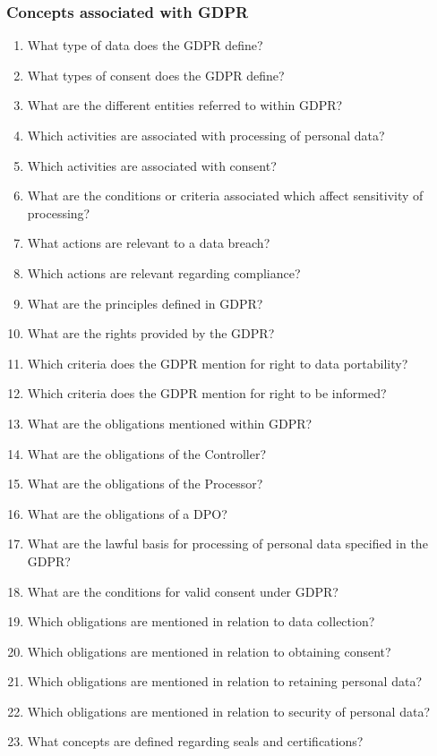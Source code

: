 \subsubsection{Concepts associated with GDPR}
\begin{enumerate}[label={\textit{CQ.\theenumi}},resume]
    \item What type of data does the GDPR define?
    \item What types of consent does the GDPR define?
    \item What are the different entities referred to within GDPR?
    \item Which activities are associated with processing of personal data?
    \item Which activities are associated with consent?
    \item What are the conditions or criteria associated which affect sensitivity of processing?
    \item What actions are relevant to a data breach?
    \item Which actions are relevant regarding compliance?
    \item What are the principles defined in GDPR?
    \item What are the rights provided by the GDPR?
    \item Which criteria does the GDPR mention for right to data portability?
    \item Which criteria does the GDPR mention for right to be informed?
    \item What are the obligations mentioned within GDPR?
    \item What are the obligations of the Controller?
    \item What are the obligations of the Processor?
    \item What are the obligations of a DPO?
    \item What are the lawful basis for processing of personal data specified in the GDPR?
    \item What are the conditions for valid consent under GDPR?
    \item Which obligations are mentioned in relation to data collection?
    \item Which obligations are mentioned in relation to obtaining consent?
    \item Which obligations are mentioned in relation to retaining personal data?
    \item Which obligations are mentioned in relation to security of personal data?
    \item What concepts are defined regarding seals and certifications?
\end{enumerate}

